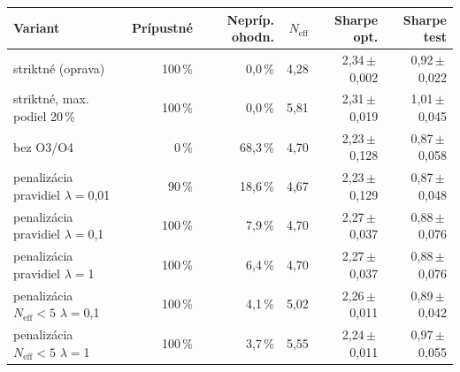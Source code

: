 \begin{tabular}{@{}lrrrrr@{}}
\toprule
Variant & Prípustné & Nepríp. ohodn. & $N_\text{eff}$ & Sharpe opt. & Sharpe test \\
\midrule
striktné (oprava) & 100\,\% & 0{,}0\,\% & 4{,}28 & 2{,}34\,$\pm$\,0{,}002 & 0{,}92\,$\pm$\,0{,}022\\
striktné, max. podiel 20\,\% & 100\,\% & 0{,}0\,\% & 5{,}81 & 2{,}31\,$\pm$\,0{,}019 & 1{,}01\,$\pm$\,0{,}045\\
bez O3/O4 & 0\,\% & 68{,}3\,\% & 4{,}70 & 2{,}23\,$\pm$\,0{,}128 & 0{,}87\,$\pm$\,0{,}058\\
penalizácia pravidiel $\lambda=$0{,}01 & 90\,\% & 18{,}6\,\% & 4{,}67 & 2{,}23\,$\pm$\,0{,}129 & 0{,}87\,$\pm$\,0{,}048\\
penalizácia pravidiel $\lambda=$0{,}1 & 100\,\% & 7{,}9\,\% & 4{,}70 & 2{,}27\,$\pm$\,0{,}037 & 0{,}88\,$\pm$\,0{,}076\\
penalizácia pravidiel $\lambda=$1 & 100\,\% & 6{,}4\,\% & 4{,}70 & 2{,}27\,$\pm$\,0{,}037 & 0{,}88\,$\pm$\,0{,}076\\
penalizácia $N_\text{eff}<5$ $\lambda=$0{,}1 & 100\,\% & 4{,}1\,\% & 5{,}02 & 2{,}26\,$\pm$\,0{,}011 & 0{,}89\,$\pm$\,0{,}042\\
penalizácia $N_\text{eff}<5$ $\lambda=$1 & 100\,\% & 3{,}7\,\% & 5{,}55 & 2{,}24\,$\pm$\,0{,}011 & 0{,}97\,$\pm$\,0{,}055\\
\bottomrule
\end{tabular}
